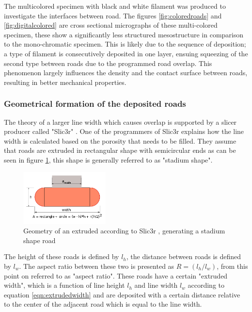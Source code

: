 The multicolored specimen with black and white filament was produced to investigate the interfaces between road. The figures \ref{fig:coloredroads} and \ref{fig:digitalcolored} are cross sectional micrographs of these multi-colored specimen, these show a significantly less structured mesostructure in comparison to the mono-chromatic specimen. This is likely due to the sequence of deposition; a type of filament is consecutively deposited in one layer,  ensuing squeezing of the second type between roads due to the programmed road overlap. This phenomenon largely influences the density and the contact surface between roads, resulting in better mechanical properties.

\subsubsection{Geometrical formation of the deposited roads}
The theory of a larger line width which causes overlap is supported by a slicer producer called "Slic3r" \cite{GaryHodgsonSlic3rMath}. One of the programmers of Slic3r explains how the line width is calculated based on the porosity that needs to be filled. They assume that roads are extruded in rectangular shape with  semicircular ends as can be seen in figure \ref{fig:Slic3rshape}, this shape is generally referred to as "stadium shape".

\begin{figure}[H]
   \centering
    \includegraphics[width=0.40\textwidth]{chapter_2/figures/Slic3rshape.png}
    \caption{Geometry of an extruded according to Slic3r \cite{GaryHodgsonSlic3rMath}, generating a stadium shape road}
    \label{fig:Slic3rshape}
\end{figure}

The height of these roads is defined by $l_h$, the distance between roads is defined by $l_w$. The aspect ratio between these two is presented as $R=(l_h/l_w)$, from this point on referred to as "aspect ratio".
These roads have a certain "extruded width", which is a function of line height $l_h$ and line width $l_w$ according to equation \ref{eqn:extrudedwidth} and are deposited with a certain distance relative to the center of the adjacent road which is equal to the line width. 

